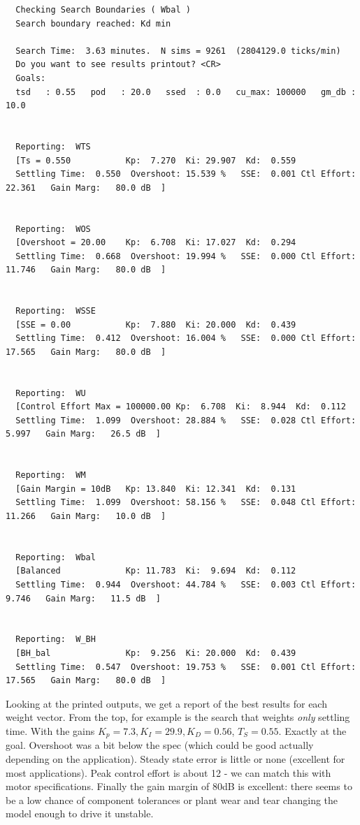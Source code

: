\begin{verbatim}
  Checking Search Boundaries ( Wbal )
  Search boundary reached: Kd min

  Search Time:  3.63 minutes.  N sims = 9261  (2804129.0 ticks/min)
  Do you want to see results printout? <CR>
  Goals:
  tsd   : 0.55   pod   : 20.0   ssed  : 0.0   cu_max: 100000   gm_db : 10.0


  Reporting:  WTS
  [Ts = 0.550           Kp:  7.270  Ki: 29.907  Kd:  0.559
  Settling Time:  0.550  Overshoot: 15.539 %   SSE:  0.001 Ctl Effort: 22.361   Gain Marg:   80.0 dB  ]


  Reporting:  WOS
  [Overshoot = 20.00    Kp:  6.708  Ki: 17.027  Kd:  0.294
  Settling Time:  0.668  Overshoot: 19.994 %   SSE:  0.000 Ctl Effort: 11.746   Gain Marg:   80.0 dB  ]


  Reporting:  WSSE
  [SSE = 0.00           Kp:  7.880  Ki: 20.000  Kd:  0.439
  Settling Time:  0.412  Overshoot: 16.004 %   SSE:  0.000 Ctl Effort: 17.565   Gain Marg:   80.0 dB  ]


  Reporting:  WU
  [Control Effort Max = 100000.00 Kp:  6.708  Ki:  8.944  Kd:  0.112
  Settling Time:  1.099  Overshoot: 28.884 %   SSE:  0.028 Ctl Effort:  5.997   Gain Marg:   26.5 dB  ]


  Reporting:  WM
  [Gain Margin = 10dB   Kp: 13.840  Ki: 12.341  Kd:  0.131
  Settling Time:  1.099  Overshoot: 58.156 %   SSE:  0.048 Ctl Effort: 11.266   Gain Marg:   10.0 dB  ]


  Reporting:  Wbal
  [Balanced             Kp: 11.783  Ki:  9.694  Kd:  0.112
  Settling Time:  0.944  Overshoot: 44.784 %   SSE:  0.003 Ctl Effort:  9.746   Gain Marg:   11.5 dB  ]


  Reporting:  W_BH
  [BH_bal               Kp:  9.256  Ki: 20.000  Kd:  0.439
  Settling Time:  0.547  Overshoot: 19.753 %   SSE:  0.001 Ctl Effort: 17.565   Gain Marg:   80.0 dB  ]
  \end{verbatim}

Looking at the printed outputs, we get a report of the best results for each weight vector.  From the top, for example is the search
that weights {\it only} settling time.   With the gains $K_p=7.3,
K_I = 29.9, K_D = 0.56$, $T_S= 0.55$.  Exactly at
the goal.  Overshoot was a bit below the spec (which could be
good actually depending on the application).
Steady state error is little or none (excellent for most applications).
Peak control effort is about 12
- we can match this with motor specifications.  Finally the gain margin of 80dB is excellent:
there seems to be a low chance of component tolerances or
plant wear and tear changing the model enough to drive it unstable.

